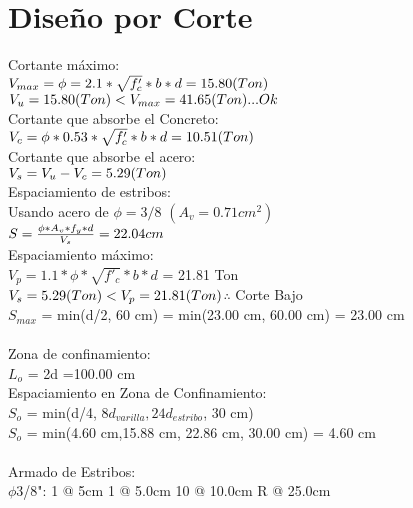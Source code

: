 \documentclass{article}%
\begin{document}
%
\section{Diseño por Corte}%
\label{sec:DiseoporCorte}%
Cortante máximo: \\$ V_{max} = \phi=2.1*\sqrt{f'_{c}}*b*d = 15.80(Ton) \\ $$ V_{u} = 15.80 (Ton) < V_{max} = 41.65 (Ton) ... Ok \\$\\ Cortante que absorbe el Concreto: \\$ V_{c}=\phi*0.53*\sqrt{f'_{c}}*b*d = 10.51(Ton) \\$\\Cortante que absorbe el acero:\\ $ V_{s} = V_{u} - V_{c} = 5.29(Ton) \\$\\ Espaciamiento de estribos: \\ Usando acero de $\phi = 3/8$  $(A_{v} = 0.71 cm^{2}) $\\$ S = \frac{\phi*A_{v}*f_{y}*d}{V_{s}} = 22.04 cm \\$\\ Espaciamiento máximo: \\$ V_p = 1.1*\phi*\sqrt{f'_{c}}*b*d $ = 21.81 Ton\\$ V_{s} = 5.29 (Ton) < V_{p} = 21.81 (Ton) \\$$\therefore$ Corte Bajo \\$ S_{max} $ = min(d/2, 60 cm) = min(23.00 cm, 60.00 cm) = 23.00 cm \\ \\ Zona de confinamiento: \\$L_{o}$ = 2d =100.00 cm \\Espaciamiento en Zona de Confinamiento: \\$S_{o}$ = min(d/4, $8d_{varilla}, 24d_{estribo}$, 30 cm) \\$S_{o}$ = min(4.60 cm,15.88 cm, 22.86 cm, 30.00 cm) = 4.60 cm \\ \\ Armado de Estribos: \\$\phi$3/8": 1 @ 5cm 1 @ 5.0cm 10 @ 10.0cm R @ 25.0cm 

%
\end{document}

